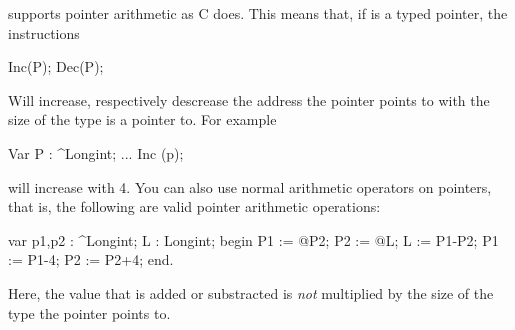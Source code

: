 \documentclass{report}
\begin{document}
\fpc supports pointer arithmetic as C does. This means that, if  is a
typed pointer, the instructions
\begin{listing}
Inc(P);
Dec(P);
\end{listing}
Will increase, respectively descrease the address the pointer points to
with the size of the type  is a pointer to. For example
\begin{listing}
Var P : ^Longint;
...
 Inc (p);
\end{listing}
will increase  with 4.
You can also use normal arithmetic operators on pointers, that is, the
following are valid pointer arithmetic operations:
\begin{listing}
var  p1,p2 : ^Longint;
     L : Longint;
begin
  P1 := @P2;
  P2 := @L;
  L := P1-P2;
  P1 := P1-4;
  P2 := P2+4;
end.
\end{listing}
Here, the value that is added or substracted is {\em not} multiplied by the 
size of the type the pointer points to.
\end{document}
